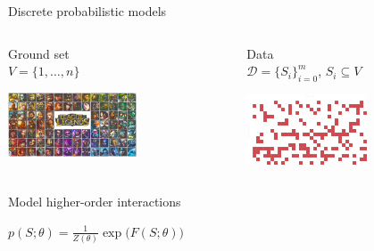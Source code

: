 \documentclass[mathserif]{beamer}
\newcommand{\qboxa}[1]{%
\begin{tcolorbox}[enhanced jigsaw,size=tight,hbox,boxsep=4pt,boxrule=1pt,coltext=textcolor,colframe=col1,opacityback=0,opacityframe=1]
\strut #1
\end{tcolorbox}%
}
\begin{document}
\begin{frame}{Discrete probabilistic models}
\begin{columns}[t]
\begin{column}{0.5\textwidth}
\centering
Ground set\\[0.5em]
$V = \{1,\ldots,n\}$

\vspace{1.3em}
\includegraphics[width=1.5in]{figures/champions_transparent.png}
\end{column}
\begin{column}{0.5\textwidth}
\centering
Data\\[0.5em]
$\mathcal D = \{S_i\}_{i=0}^m$, $S_i \subseteq V$

\vspace{0.9em}
\includegraphics[width=1.4in]{figures/grid_hots.pdf}
\end{column}
\end{columns}

\vspace{1.5em}

\begin{center}
Model {\color{col1}higher-order} interactions\\[0.5em]

\qboxa{
$p(S; \theta) = \displaystyle\frac{1}{Z(\theta)}\exp \big( F(S; \theta) \big)$
}

\end{center}
\end{frame}
\end{document}
